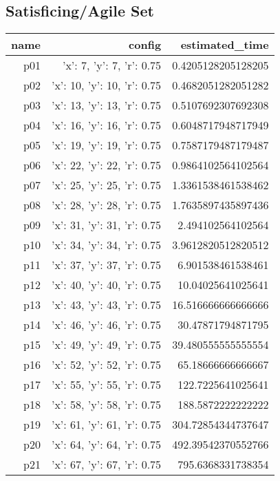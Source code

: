\documentclass{article}
\begin{document}
                                \subsection*{Satisficing/Agile Set}
                                
                            \begin{center}
                            \scriptsize
                            \begin{tabular}{r|r|r}
                            name & config & estimated\_time\\\midrule
                              p01&{'x': 7, 'y': 7, 'r': 0.75}&0.4205128205128205\\
  p02&{'x': 10, 'y': 10, 'r': 0.75}&0.4682051282051282\\
  p03&{'x': 13, 'y': 13, 'r': 0.75}&0.5107692307692308\\
  p04&{'x': 16, 'y': 16, 'r': 0.75}&0.6048717948717949\\
  p05&{'x': 19, 'y': 19, 'r': 0.75}&0.7587179487179487\\
  p06&{'x': 22, 'y': 22, 'r': 0.75}&0.9864102564102564\\
  p07&{'x': 25, 'y': 25, 'r': 0.75}&1.3361538461538462\\
  p08&{'x': 28, 'y': 28, 'r': 0.75}&1.7635897435897436\\
  p09&{'x': 31, 'y': 31, 'r': 0.75}&2.494102564102564\\
  p10&{'x': 34, 'y': 34, 'r': 0.75}&3.9612820512820512\\
  p11&{'x': 37, 'y': 37, 'r': 0.75}&6.901538461538461\\
  p12&{'x': 40, 'y': 40, 'r': 0.75}&10.04025641025641\\
  p13&{'x': 43, 'y': 43, 'r': 0.75}&16.516666666666666\\
  p14&{'x': 46, 'y': 46, 'r': 0.75}&30.47871794871795\\
  p15&{'x': 49, 'y': 49, 'r': 0.75}&39.480555555555554\\
  p16&{'x': 52, 'y': 52, 'r': 0.75}&65.18666666666667\\
  p17&{'x': 55, 'y': 55, 'r': 0.75}&122.7225641025641\\
  p18&{'x': 58, 'y': 58, 'r': 0.75}&188.5872222222222\\
  p19&{'x': 61, 'y': 61, 'r': 0.75}&304.72854344737647\\
  p20&{'x': 64, 'y': 64, 'r': 0.75}&492.39542370552766\\
  p21&{'x': 67, 'y': 67, 'r': 0.75}&795.6368331738354\\

\end{tabular}
\end{center}
\end{document}
